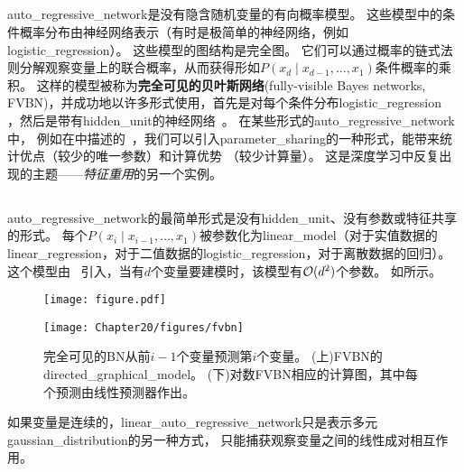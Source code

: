 
\subsection{}
\label{sec:auto_regressive_networks}
\gls{auto_regressive_network}是没有隐含随机变量的有向概率模型。
这些模型中的条件概率分布由神经网络表示（有时是极简单的神经网络，例如\gls{logistic_regression}）。
这些模型的图结构是完全图。
它们可以通过概率的链式法则分解观察变量上的联合概率，从而获得形如$P(x_d \mid x_{d-1},\dots, x_1)$条件概率的乘积。
这样的模型被称为\textbf{完全可见的贝叶斯网络}(fully-visible Bayes networks, FVBN)，并成功地以许多形式使用，首先是对每个条件分布\gls{logistic_regression}~\citep{Frey98} ，然后是带有\gls{hidden_unit}的神经网络~\citep{Bengio+Bengio-NIPS2000,Larochelle+Murray-2011-small}。
在某些形式的\gls{auto_regressive_network}中， 例如在中描述的~\citep{Larochelle+Murray-2011-small}，我们可以引入\gls{parameter_sharing}的一种形式，能带来统计优点（较少的唯一参数）和计算优势 （较少计算量）。
这是深度学习中反复出现的主题——\emph{特征重用}的另一个实例。


\subsection{}
\label{sec:linear_auto_regressive_networks}

\gls{auto_regressive_network}的最简单形式是没有\gls{hidden_unit}、没有参数或特征共享的形式。
每个$P(x_i \mid x_{i-1},\dots, x_1)$被参数化为\gls{linear_model}（对于实值数据的\gls{linear_regression}，对于二值数据的\gls{logistic_regression}，对于离散数据的回归）。
这个模型由~\citet{Frey98} 引入，当有$d$个变量要建模时，该模型有$\mathcal{O}(d^2)$个参数。
如所示。

\begin{figure}[!htb]
\ifOpenSource
\centerline{\texttt{[image: figure.pdf]}}
\else
\centerline{\texttt{[image: Chapter20/figures/fvbn]}}
\fi
\caption{完全可见的\gls{BN}从前$i-1$个变量预测第$i$个变量。
(上)FVBN的\gls{directed_graphical_model}。
(下)对数FVBN相应的计算图，其中每个预测由线性预测器作出。
}
\label{fig:chap20_fvbn}
\end{figure}

如果变量是连续的，\gls{linear_auto_regressive_network}只是表示多元\gls{gaussian_distribution}的另一种方式， 只能捕获观察变量之间的线性成对相互作用。
 
